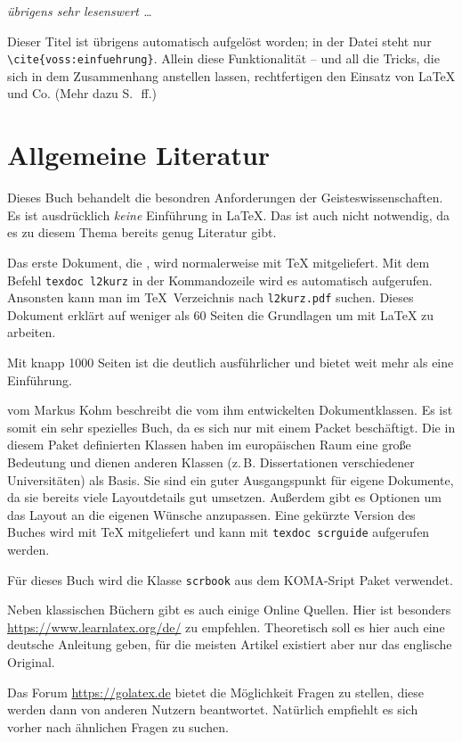 \parbox{40mm}{
   \emph{übrigens sehr lesenswert \dots}
}
\bigskip

Dieser Titel ist übrigens automatisch aufgelöst worden; 
in der Datei steht nur \lstinline/\cite{voss:einfuehrung}/.
Allein diese Funktionalität -- und all die Tricks, die sich in dem Zusammenhang anstellen
lassen, rechtfertigen den Einsatz von \LaTeX{} und Co. (Mehr dazu S.~\pageref{biblatex}\,ff.)

\section{Allgemeine Literatur}

Dieses Buch behandelt die besondren Anforderungen der Geisteswissenschaften.
Es ist ausdrücklich \emph{keine} Einführung in \LaTeX.
Das ist auch nicht notwendig, da es zu diesem Thema bereits genug Literatur gibt.

Das erste Dokument, die  \parencite{l2kurz}, wird normalerweise mit \TeX{} mitgeliefert.
Mit dem Befehl \lstinline/texdoc l2kurz/ in der Kommandozeile wird es automatisch aufgerufen.
Ansonsten kann man im \TeX\ Verzeichnis nach \lstinline/l2kurz.pdf/ suchen.
Dieses Dokument erklärt auf weniger als 60 Seiten die Grundlagen um mit \LaTeX{} zu arbeiten.

Mit knapp 1000 Seiten ist die  \parencite{voss:einfuehrung} deutlich ausführlicher
und bietet weit mehr als eine Einführung.

 \parencite{kohm:2020} vom Markus Kohm beschreibt die vom ihm entwickelten Dokumentklassen.
Es ist somit ein sehr spezielles Buch, da es sich nur mit einem Packet beschäftigt.
Die in diesem Paket definierten Klassen haben im europäischen Raum eine große Bedeutung 
und dienen anderen Klassen (z.\,B. Dissertationen verschiedener Universitäten) als Basis.
Sie sind ein guter Ausgangspunkt für eigene Dokumente, da sie bereits viele Layoutdetails gut umsetzen.
Außerdem gibt es Optionen um das Layout an die eigenen Wünsche anzupassen.
Eine gekürzte Version des Buches wird mit \TeX{} mitgeliefert und kann mit \lstinline/texdoc scrguide/ aufgerufen werden.

Für dieses Buch wird die Klasse \lstinline/scrbook/ aus dem KOMA-Sript Paket verwendet.

Neben klassischen Büchern gibt es auch einige Online Quellen.
Hier ist besonders \url{https://www.learnlatex.org/de/} zu empfehlen.
Theoretisch soll es hier auch eine deutsche Anleitung geben, 
für die meisten Artikel existiert aber nur das englische Original.

Das Forum \url{https://golatex.de} bietet die Möglichkeit Fragen zu stellen, 
diese werden dann von anderen Nutzern beantwortet.
Natürlich empfiehlt es sich vorher nach ähnlichen Fragen zu suchen.

\endinput


